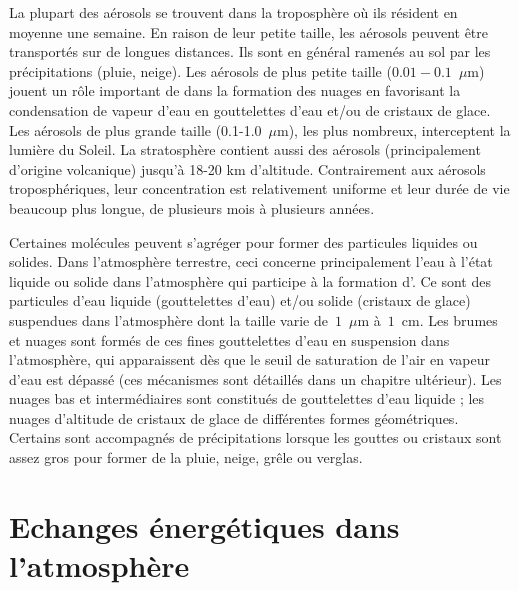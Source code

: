 La plupart des aérosols se trouvent dans la troposphère où ils résident en moyenne une semaine. En raison de leur petite taille, les aérosols peuvent être transportés sur de longues distances. Ils sont en général ramenés au sol par les précipitations (pluie, neige). Les aérosols de plus petite taille ($0.01-0.1$~$\mu$m) jouent un rôle important de  dans la formation des nuages en favorisant la condensation de vapeur d'eau en gouttelettes d'eau et/ou de cristaux de glace. Les aérosols de plus grande taille (0.1-1.0~$\mu$m), les plus nombreux, interceptent la lumière du Soleil. La stratosphère contient aussi des aérosols (principalement d'origine volcanique) jusqu'à 18-20 km d’altitude. Contrairement aux aérosols troposphériques, leur concentration est relativement uniforme et leur durée de vie beaucoup plus longue, de plusieurs mois à plusieurs années.  

\sk
Certaines molécules peuvent s’agréger pour former des particules liquides ou solides. Dans l'atmosphère terrestre, ceci concerne principalement l'eau à l'état liquide ou solide dans l'atmosphère qui participe à la formation d'. Ce sont des particules d’eau liquide (gouttelettes d'eau) et/ou solide (cristaux de glace) suspendues dans l'atmosphère dont la taille varie de~$1$~$\mu$m à~$1$~cm. Les brumes et nuages sont formés de ces fines gouttelettes d'eau en suspension dans l'atmosphère, qui apparaissent dès que le seuil de saturation de l'air en vapeur d'eau est dépassé (ces mécanismes sont détaillés dans un chapitre ultérieur). Les nuages bas et intermédiaires sont constitués de gouttelettes d’eau liquide ; les nuages d’altitude de cristaux de glace de différentes formes géométriques. Certains sont accompagnés de précipitations lorsque les gouttes ou cristaux sont assez gros pour former de la pluie, neige, grêle ou verglas. %


\mk
\section{Echanges énergétiques dans l'atmosphère}

